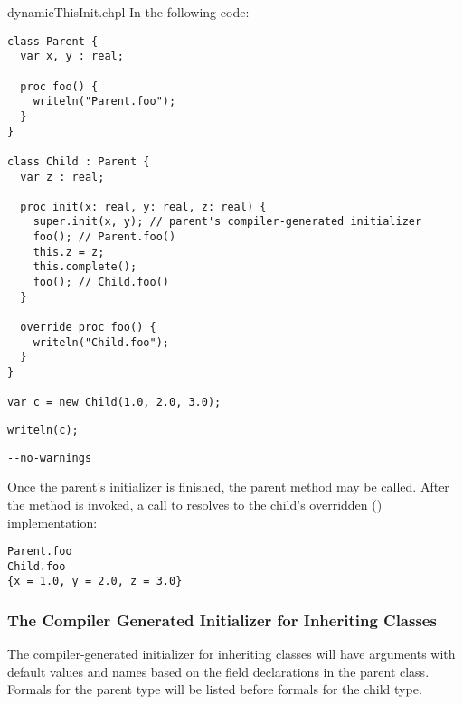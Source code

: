 \begin{chapelexample}{dynamicThisInit.chpl}
In the following code:
\begin{chapel}
\begin{verbatim}
class Parent {
  var x, y : real;

  proc foo() {
    writeln("Parent.foo");
  }
}

class Child : Parent {
  var z : real;

  proc init(x: real, y: real, z: real) {
    super.init(x, y); // parent's compiler-generated initializer
    foo(); // Parent.foo()
    this.z = z;
    this.complete();
    foo(); // Child.foo()
  }

  override proc foo() {
    writeln("Child.foo");
  }
}

var c = new Child(1.0, 2.0, 3.0);
\end{verbatim}
\end{chapel}
\begin{chapelpost}
\begin{verbatim}
writeln(c);
\end{verbatim}
\end{chapelpost}
\begin{chapelcompopts}
\begin{verbatim}
--no-warnings
\end{verbatim}
\end{chapelcompopts}
Once the parent's initializer is finished, the parent method  may be
called. After the  method is invoked, a call to 
resolves to the child's overridden ()
implementation:
\begin{chapelprintoutput}
\begin{verbatim}
Parent.foo
Child.foo
{x = 1.0, y = 2.0, z = 3.0}
\end{verbatim}
\end{chapelprintoutput}
\end{chapelexample}

\subsubsection{The Compiler Generated Initializer for Inheriting Classes}
\label{The_Compiler_Generated_Initializer_for_Inheriting_Classes}

The compiler-generated initializer for inheriting classes will have arguments
with default values and names based on the field declarations in the parent
class. Formals for the parent type will be listed before formals for the
child type.

